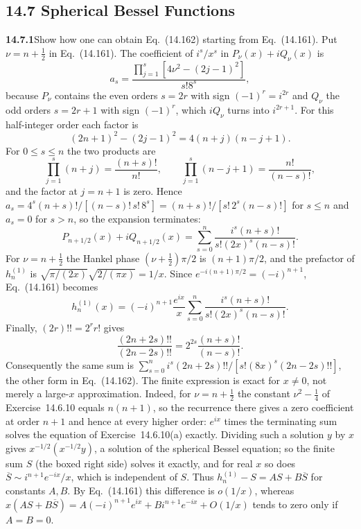 \subsection*{14.7 Spherical Bessel Functions}
\noindent{}

\par\bigskip
\noindent\textbf{14.7.1}\quad Show how one can obtain Eq.~(14.162)
starting from Eq.~(14.161).
\solution
Put $\nu=n+\tfrac12$ in Eq.~(14.161). The coefficient of
$i^s/x^s$ in $P_\nu(x)+iQ_\nu(x)$ is
\[
a_s=\frac{\prod_{j=1}^s[4\nu^2-(2j-1)^2]}{s!8^s},
\]
because $P_\nu$ contains the even orders $s=2r$ with sign
$(-1)^r=i^{2r}$ and $Q_\nu$ the odd orders $s=2r+1$ with sign
$(-1)^r$, which $iQ_\nu$ turns into $i^{2r+1}$.
For this half-integer order each factor is
\[
(2n+1)^2-(2j-1)^2=4(n+j)(n-j+1).
\]
For $0\le s\le n$ the two products are
\[
\prod_{j=1}^s(n+j)=\frac{(n+s)!}{n!},\qquad
\prod_{j=1}^s(n-j+1)=\frac{n!}{(n-s)!},
\]
and the factor at $j=n+1$ is zero. Hence
$a_s=4^s(n+s)!/[(n-s)!\,s!\,8^s]=(n+s)!/[s!\,2^s(n-s)!]$
for $s\le n$ and $a_s=0$ for $s>n$, so the expansion terminates:
\[
P_{n+1/2}(x)+iQ_{n+1/2}(x)
=\sum_{s=0}^n\frac{i^s(n+s)!}{s!(2x)^s(n-s)!}.
\]
For $\nu=n+\frac12$ the Hankel phase $(\nu+\frac12)\pi/2$ is
$(n+1)\pi/2$, and the prefactor of $h_n^{(1)}$ is
$\sqrt{\pi/(2x)}\sqrt{2/(\pi x)}=1/x$.
Since $e^{-i(n+1)\pi/2}=(-i)^{n+1}$, Eq.~(14.161) becomes
\[
\boxed{h_n^{(1)}(x)=(-i)^{n+1}\frac{e^{ix}}x
\sum_{s=0}^n\frac{i^s(n+s)!}{s!(2x)^s(n-s)!}.}
\]
Finally, $(2r)!!=2^r r!$ gives
\[
\frac{(2n+2s)!!}{(2n-2s)!!}
=2^{2s}\frac{(n+s)!}{(n-s)!}.
\]
Consequently the same sum is
$\sum_{s=0}^n i^s(2n+2s)!!/[s!(8x)^s(2n-2s)!!]$,
the other form in Eq.~(14.162). The finite expression is exact for
$x\ne0$, not merely a large-$x$ approximation. Indeed, for
$\nu=n+\frac12$ the constant $\nu^2-\frac14$ of Exercise~14.6.10
equals $n(n+1)$, so the recurrence there gives a zero coefficient
at order $n+1$ and hence at every higher order: $e^{ix}$ times the
terminating sum solves the equation of Exercise~14.6.10(a) exactly.
Dividing such a solution $y$ by $x$ gives
$x^{-1/2}(x^{-1/2}y)$, a solution of the spherical Bessel
equation; so the finite sum $S$ (the boxed right side) solves it
exactly, and for real $x$ so does
$\overline S\sim i^{n+1}e^{-ix}/x$, which is independent of $S$.
Thus $h_n^{(1)}-S=AS+B\overline S$ for constants $A,B$. By
Eq.~(14.161) this difference is $o(1/x)$, whereas
$x(AS+B\overline S)=A(-i)^{n+1}e^{ix}+Bi^{n+1}e^{-ix}+O(1/x)$
tends to zero only if $A=B=0$.

